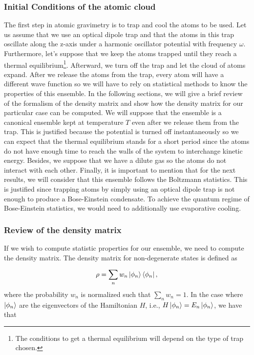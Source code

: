 \documentclass{article}
\begin{document}
\subsubsection{Initial Conditions of the atomic cloud}
The first step in atomic gravimetry is to trap and cool the atoms to be used. Let us assume that we use an optical dipole trap and that the atoms in this trap oscillate along the z-axis under a harmonic oscillator potential with frequency $\omega$. Furthermore, let's suppose that we keep the atoms trapped until they reach a thermal equilibrium\footnote{The conditions to get a thermal equilibrium will depend on the type of trap chosen.}. Afterward, we turn off the trap and let the cloud of atoms expand. After we release the atoms from the trap, every atom will have a different wave function so we will have to rely on statistical methods to know the properties of this ensemble. In the following sections, we will give a brief review of the formalism of the density matrix and show how the density matrix for our particular case can be computed. We will suppose that the ensemble is a canonical ensemble kept at temperature $T$ even after we release them from the trap. This is justified because the potential is turned off instantaneously so we can expect that the thermal equilibrium stands for a short period since the atoms do not have enough time to reach the walls of the system to interchange kinetic energy. Besides, we suppose that we have a dilute gas so the atoms do not interact with each other. Finally, it is important to mention that for the next results, we will consider that this ensemble follows the Boltzmann statistics. This is justified since trapping atoms by simply using an optical dipole trap is not enough to produce a Bose-Einstein condensate. To achieve the quantum regime of Bose-Einstein statistics, we would need to additionally use evaporative cooling.

\subsubsection{Review of the density matrix}
If we wish to compute statistic properties for our ensemble, we need to compute the density matrix. The density matrix for non-degenerate states is defined as

\begin{equation}
    \rho = \sum_{n} w_{n} \ket{\phi_n} \bra{\phi_n},
\end{equation}
%
where the probability $w_{n}$ is normalized such that $\sum_{n} w_{n} = 1$. In the case where $\ket{\phi_n}$ are the eigenvectors of the Hamiltonian $H$, i.e., $H \ket{\phi_n} = E_n \ket{\phi_n}$, we have that \cite{sakurai2017modern}
\end{document}
